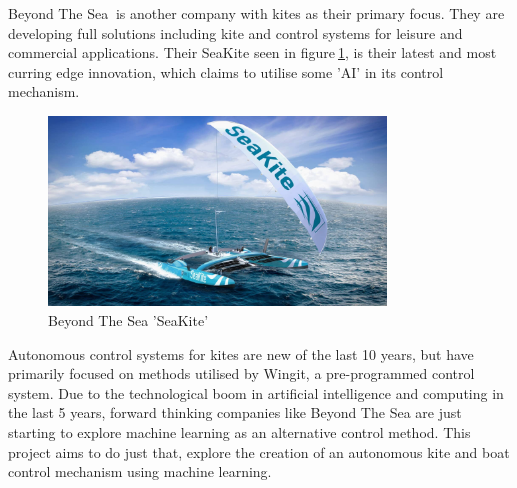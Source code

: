 Beyond The Sea$~$\cite{beyondthesea} is another company with kites as their primary focus. They are developing full solutions including kite and control systems for leisure and commercial applications. Their SeaKite seen in figure$~$\ref{seakite}, is their latest and most curring edge innovation, which claims to utilise some 'AI' in its control mechanism. 

\begin{figure}
\centering
    \includegraphics[width=0.8\textwidth]{Images/seakite.jpg}
    \caption{Beyond The Sea 'SeaKite'}\label{seakite}
\end{figure}

Autonomous control systems for kites are new of the last 10 years, but have primarily focused on methods utilised by Wingit, a pre-programmed control system. Due to the technological boom in artificial intelligence and computing in the last 5 years, forward thinking companies like Beyond The Sea are just starting to explore machine learning as an alternative control method. This project aims to do just that, explore the creation of an autonomous kite and boat control mechanism using machine learning. 